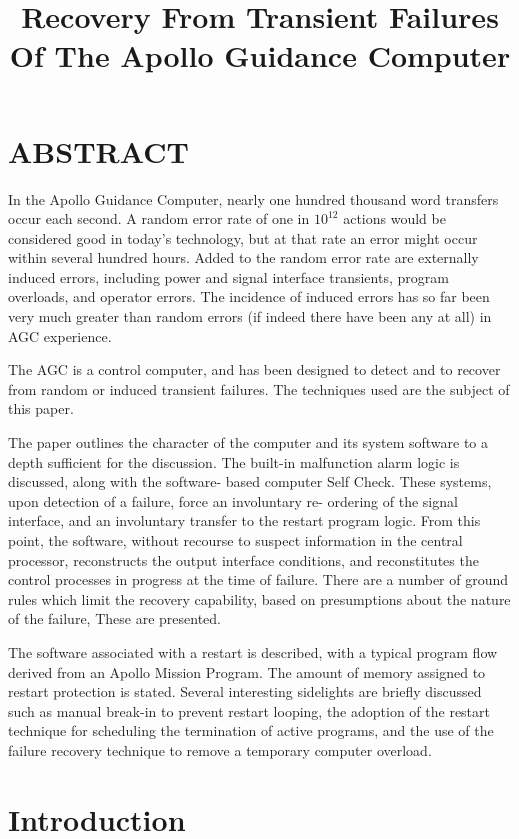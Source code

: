 \documentclass[oxford]{ahsan}
\title{Recovery From Transient Failures Of The Apollo Guidance Computer}
\begin{document}
\maketitle

\section{ABSTRACT}

In the Apollo Guidance Computer, nearly one hundred thousand word transfers occur each
second. A random error rate of one in \(10^{12}\) actions would be considered good in today’s
technology, but at that rate an error might occur within several hundred hours. Added
to the random error rate are externally induced errors, including power and signal
interface transients, program overloads, and operator errors. The incidence of induced
errors has so far been very much greater than random errors (if indeed there have been
any at all) in AGC experience.

The AGC is a control computer, and has been designed to detect and to recover from
random or induced transient failures. The techniques used are the subject of this
paper.

The paper outlines the character of the computer and its system software to a depth
sufficient for the discussion. The built-in malfunction alarm logic is discussed,
along with the software- based computer Self Check. These systems, upon detection of a
failure, force an involuntary re- ordering of the signal interface, and an involuntary
transfer to the restart program logic. From this point, the software, without recourse
to suspect information in the central processor, reconstructs the output interface
conditions, and reconstitutes the control processes in progress at the time of failure.
There are a number of ground rules which limit the recovery capability, based on
presumptions about the nature of the failure, These are presented.

The software associated with a restart is described, with a typical program flow
derived from an Apollo Mission Program. The amount of memory assigned to restart
protection is stated. Several interesting sidelights are briefly discussed such as
manual break-in to prevent restart looping, the adoption of the restart technique for
scheduling the termination of active programs, and the use of the failure recovery
technique to remove a temporary computer overload.

\section{Introduction}
\end{document}
